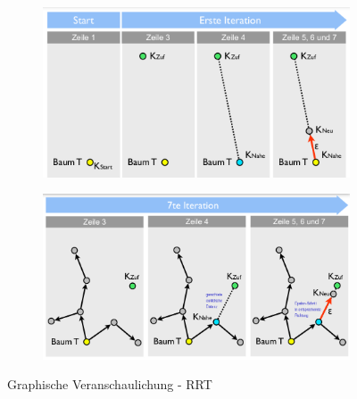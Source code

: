 \begin{figure}[h!]
	\centering
	\begin{subfigure}{.4\textwidth}
		\includegraphics[width=\textwidth]{figures/ch04_rrt1.png}
	\end{subfigure}
	\begin{subfigure}{.4\textwidth}
		\includegraphics[width=\textwidth]{figures/ch04_rrt2.png}
	\end{subfigure}
	\caption{Graphische Veranschaulichung - RRT}
	\label{fig:rrt}
\end{figure}
